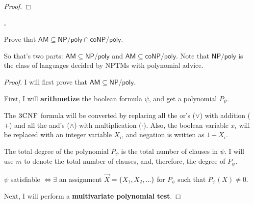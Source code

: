 \documentclass[letterpaper,11pt]{article}
\newcommand{\cc}[1]{\ensuremath{\textsf{#1}}\xspace}
\newcommand{\NP}{\cc{NP}}
\newcommand{\coNP}{\cc{coNP}}
\newcommand{\AM}{\cc{AM}}
\newcounter{problem}
\newenvironment{problem}%
{%
	\stepcounter{problem}%
	\textbf{\theproblem.}
	\large
}{\\}%
\newcommand{\NPpoly}{\NP/\textsf{poly}}
\begin{document}
\begin{proof}
\end{proof}


\begin{problem}
Prove that $\AM \subseteq \NP/\textsf{poly} \cap \coNP/\textsf{poly}$. 

So that's two parts: $\AM \subseteq \NP/\textsf{poly}$ and $\AM \subseteq \coNP/\textsf{poly}$. 
Note that $\NP/\textsf{poly}$ is the class of languages decided by NPTMs with polynomial advice. 
\end{problem}

\begin{proof}
I will first prove that $\AM \subseteq \NPpoly$.

First, I will {\bf arithmetize} the boolean formula $\psi$, and get a polynomial $P_\psi$.

The $\textsc{3CNF}$ formula will be converted by replacing all the or's ($\vee$) with addition ($+$) and all the and's ($\wedge$) with multiplication ($\cdot$). 
Also, the boolean variable $x_i$ will be replaced with an integer variable $X_i$, and negation is written as $1-X_i$.

The total degree of the polynomial $P_\psi$ is the total number of clauses in $\psi$.
I will use $m$ to denote the total number of clauses, and, therefore, the degree of $P_\psi$.

$\psi$ satisfiable $\Leftrightarrow \exists$ an assignment $\vec{X}=\{X_1,X_2,...\}$ for $P_\psi$ such that $P_\psi(X) \neq 0$.

Next, I will perform a {\bf multivariate polynomial test}.
\end{proof}
\end{document}
